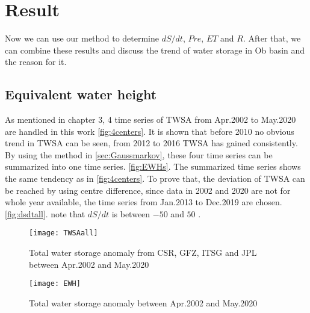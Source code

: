 \chapter{Result}
Now we can use our method to determine $dS/dt$, $Pre$, $ET$ and $R$. After that, we can combine these results and discuss the trend of water storage in Ob basin and the reason for it.
\section{Equivalent water height}
As mentioned in chapter 3, 4 time series of TWSA from Apr.2002 to May.2020 are handled in this work \autoref{fig:4centers}. It is shown that before 2010 no obvious trend in TWSA can be seen, from 2012 to 2016 TWSA has gained consistently. By using the method in \autoref{sec:Gaussmarkov}, these four time series can be summarized into one time series. \autoref{fig:EWHs}. The summarized time series shows the same tendency as in \autoref{fig:4centers}. To prove that, the deviation of TWSA can be reached by using centre difference, since data in 2002 and 2020 are not for whole year available, the time series from Jan.2013 to Dec.2019 are chosen. \autoref{fig:dsdtall}. note that $dS/dt$ is between $-50$ and $50$ .
\begin{figure}[htbp]
	\centering
	\texttt{[image: TWSAall]} %
	\caption{Total water storage anomaly from CSR, GFZ, ITSG and JPL between Apr.2002 and May.2020} 
	\label{fig:4centers}
\end{figure}
\begin{figure}[htbp]
	\centering
	\texttt{[image: EWH]} %
	\caption{Total water storage anomaly between Apr.2002 and May.2020} 
	\label{fig:EWHs}
\end{figure}\\

